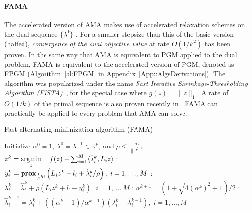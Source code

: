\documentclass[openany]{now}
\newcommand{\reals}{{\mathbb R}}
\newcommand{\argmin}{\mathop{\rm argmin}}
\newcommand{\prox}{\mathop{\bf prox}}
\begin{document}
\paragraph*{FAMA} The accelerated version of AMA makes use of accelerated relaxation schemes on the dual sequence $\{\lambda^k\}$ \cite{goldstein2014fast}. For a smaller stepsize than this of the basic version (halfed), \emph{convergence of the dual objective value} at rate $O(1/k^2)$ has been proven. In the same way that AMA is equivalent to PGM applied to the dual problem, FAMA is equivalent to the accelerated version of PGM, denoted as FPGM (Algorithm~\eqref{al:FPGM} in Appendix~\ref{App::AlgsDerivations}). The algorithm was popularized under the name \emph{Fast Iterative Shrinkage-Thresholding Algorithm (FISTA)}~\cite{fista}, for the special case where $g(z)=\|z\|_1$. A rate of $O(1/k)$ of the primal sequence is also proven recently in \cite{beck2014fast}. FAMA can practically be applied to every problem that AMA can solve.
\begin{algorithm}
\caption{Fast alternating minimization algorithm (FAMA)}
\label{al:FAMA}
\begin{algorithmic} 
\REQUIRE Initialize $\alpha^{0} = 1$, $ \lambda^{0} = \lambda^{-1}\in \reals^{p}$, and $\rho \le \frac{\sigma_f}{\|T\|^2}$
\LOOP
{}: $z^{k} = \argmin\limits_z \quad f(z) + \sum_{i=1}^M \langle  \hat{\lambda}_i^k, L_i z\rangle $
: $y_i^{k} = \prox_{\frac{1}{\rho}g_i}\left(L_iz^{k}+l_i+\hat{\lambda}_i^k/\rho\right), \; i=1,\ldots,M$
: $\lambda_i^{k} = \hat{\lambda}_i^k + \rho(L_i z^{k} + l_i - y_i^{k}),\; i=1,\ldots,M$
: $\alpha^{k+1} = \left(1+\sqrt{4(\alpha^{k})^{2}+1}\right)/2$
: $\hat{\lambda}_i^{k+1} = \lambda_i^k + ((\alpha^k-1)/\alpha^{k+1})(\lambda_i^k-\lambda_i^{k-1}),\; i=1,\ldots,M$
\ENDLOOP
\end{algorithmic}
\end{algorithm}\begin{footnotesize}
\end{footnotesize}
\end{document}

